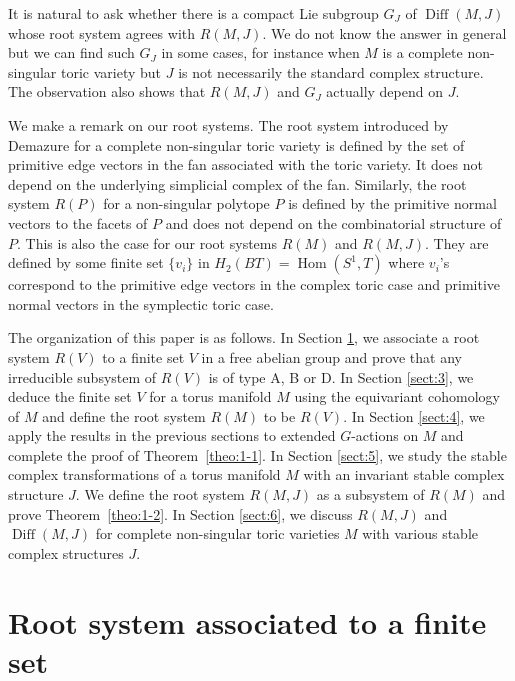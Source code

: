 \documentclass[12pt]{amsart}
\theoremstyle{plain} \numberwithin{equation}{section}
\theoremstyle{definition}
\DeclareMathOperator{\Diff}{Diff}
\DeclareMathOperator{\Hom}{Hom}
\begin{document}
It is natural to ask whether there is a compact Lie subgroup $G_J$ of $\Diff(M,J)$ whose root system agrees with $R(M,J)$.  We do not know the answer in general but we can find such $G_J$ in some cases, for instance when $M$ is a complete non-singular toric variety but $J$ is not necessarily the standard complex structure.  The observation also shows that $R(M,J)$ and $G_J$ actually depend on $J$.

We make a remark on our root systems.  The root system introduced by Demazure for a complete non-singular toric variety is defined by the set of primitive edge vectors in the fan associated with the toric variety.  It does not depend on the underlying simplicial complex of the fan.  Similarly, the root system $R(P)$ for a non-singular polytope $P$ is defined by the primitive normal vectors to the facets of $P$ and does not depend on the combinatorial structure of $P$.  This is also the case for our root systems $R(M)$ and $R(M,J)$.  They are defined by some finite set $\{ v_i\}$ in $H_2(BT)=\Hom(S^1,T)$ where $v_i$'s correspond to the primitive edge vectors in the complex toric case and primitive normal vectors in the symplectic toric case.   

The organization of this paper is as follows. In Section \ref{sect:2}, we associate a root system $R(V)$ to a finite set $V$ in a free abelian group and prove that any irreducible subsystem of $R(V)$ is of type A, B or D. In Section \ref{sect:3}, we deduce the finite set $V$ for a torus manifold $M$ using the equivariant cohomology of $M$ and define the root system $R(M)$ to be $R(V)$. In Section \ref{sect:4}, we apply the results in the previous sections to extended $G$-actions on $M$ and complete the proof of Theorem~\ref{theo:1-1}.  In Section \ref{sect:5}, we study the stable complex transformations of a torus manifold $M$ with an invariant stable complex structure $J$.  We define the root system $R(M,J)$ as a subsystem of $R(M)$ and prove Theorem~\ref{theo:1-2}.  In Section \ref{sect:6}, we discuss $R(M,J)$ and $\Diff(M,J)$ for complete non-singular toric varieties $M$ with various stable complex structures $J$.  



\section{Root system associated to a finite set} \label{sect:2}
\end{document}
